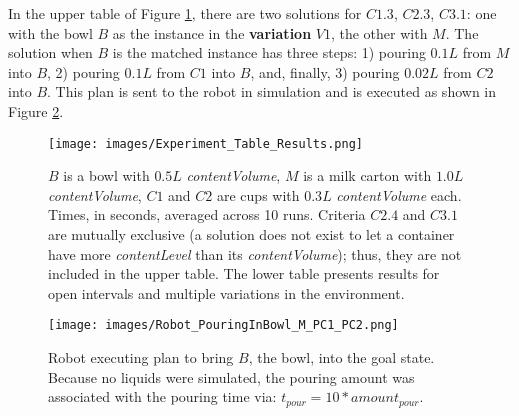 In the upper table of Figure \ref{fig:experiment_table}, there are two solutions for $C1.3$, $C2.3$, $C3.1$: one with the bowl $B$ as the instance in the \textbf{variation} $V1$, the other with $M$. The solution when $B$ is the matched instance has three steps: 1) pouring $0.1L$ from $M$ into $B$, 2) pouring $0.1L$ from $C1$ into $B$, and, finally, 3) pouring  $0.02L$ from $C2$ into $B$. This plan is sent to the robot in simulation and is executed as shown in Figure \ref{fig:robot_plan_execution}.

\begin{figure}[t!]
    \centering
    \texttt{[image: images/Experiment\_Table\_Results.png]}
    \caption{$B$ is a bowl with $0.5L$ \textit{contentVolume}, $M$ is a milk carton with $1.0L$ \textit{contentVolume}, $C1$ and $C2$ are cups with $0.3L$ \textit{contentVolume} each. Times, in seconds, averaged across 10 runs. Criteria $C2.4$ and $C3.1$ are mutually exclusive (a solution does not exist to let a container have more \textit{contentLevel} than its \textit{contentVolume}); thus, they are not included in the upper table. The lower table presents results for open intervals and multiple variations in the environment.} \label{fig:experiment_table}
\end{figure}

\begin{figure}[t!]
    \centering
    \texttt{[image: images/Robot\_PouringInBowl\_M\_PC1\_PC2.png]}
    \caption{Robot executing plan to bring $B$, the bowl, into the goal state. Because no liquids were simulated, the pouring amount was associated with the pouring time via: $t_{pour} = 10 * amount_{pour}$.} \label{fig:robot_plan_execution}
\end{figure}